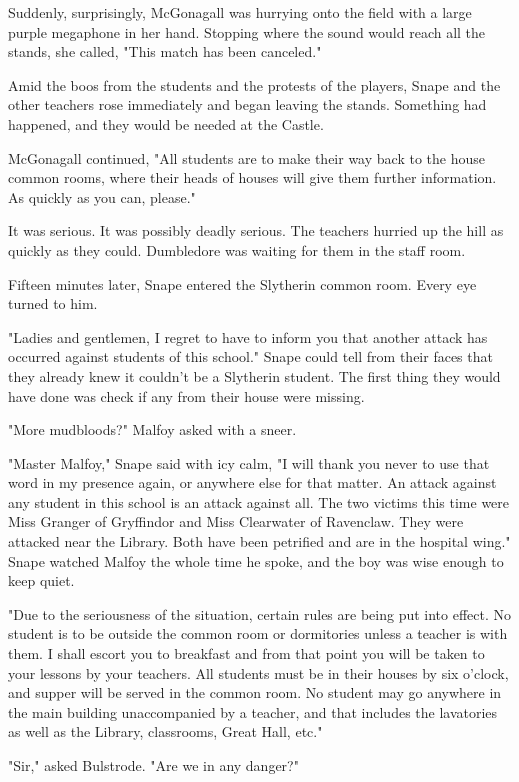 Suddenly, surprisingly, McGonagall was hurrying onto the field with a large purple megaphone in her hand. Stopping where the sound would reach all the stands, she called, "This match has been canceled."

Amid the boos from the students and the protests of the players, Snape and the other teachers rose immediately and began leaving the stands. Something had happened, and they would be needed at the Castle.

McGonagall continued, "All students are to make their way back to the house common rooms, where their heads of houses will give them further information. As quickly as you can, please."

It was serious. It was possibly deadly serious. The teachers hurried up the hill as quickly as they could. Dumbledore was waiting for them in the staff room.

Fifteen minutes later, Snape entered the Slytherin common room. Every eye turned to him.

"Ladies and gentlemen, I regret to have to inform you that another attack has occurred against students of this school." Snape could tell from their faces that they already knew it couldn't be a Slytherin student. The first thing they would have done was check if any from their house were missing.

"More mudbloods?" Malfoy asked with a sneer.

"Master Malfoy," Snape said with icy calm, "I will thank you never to use that word in my presence again, or anywhere else for that matter. An attack against any student in this school is an attack against all. The two victims this time were Miss Granger of Gryffindor and Miss Clearwater of Ravenclaw. They were attacked near the Library. Both have been petrified and are in the hospital wing." Snape watched Malfoy the whole time he spoke, and the boy was wise enough to keep quiet.

"Due to the seriousness of the situation, certain rules are being put into effect. No student is to be outside the common room or dormitories unless a teacher is with them. I shall escort you to breakfast and from that point you will be taken to your lessons by your teachers. All students must be in their houses by six o'clock, and supper will be served in the common room. No student may go anywhere in the main building unaccompanied by a teacher, and that includes the lavatories as well as the Library, classrooms, Great Hall, etc."

"Sir," asked Bulstrode. "Are we in any danger?"


